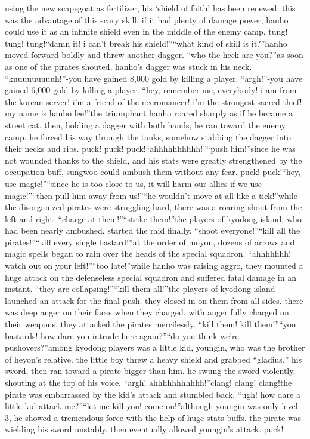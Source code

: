 using the new scapegoat as fertilizer, his ‘shield of faith’ has been renewed.
 this was the advantage of this scary skill.
 if it had plenty of damage power, hanho could use it as an infinite shield even in the middle of the enemy camp.
tung! tung! tung!“damn it! i can’t break his shield!”“what kind of skill is it?”hanho moved forward boldly and threw another dagger.
“who the heck are you?”as soon as one of the pirates shouted, hanho’s dagger was stuck in his neck.
“kuuuuuuuuuh!”-you have gained 8,000 gold by killing a player.
“argh!”-you have gained 6,000 gold by killing a player.
“hey, remember me, everybody! i am from the korean server! i’m a friend of the necromancer! i’m the strongest sacred thief! my name is hanho lee!”the triumphant hanho roared sharply as if he became a street cat.
then, holding a dagger with both hands, he ran toward the enemy camp.
 he forced his way through the tanks, somehow stabbing the dagger into their necks and ribs.
puck! puck! puck!“ahhhhhhhhhh!”“push him!”since he was not wounded thanks to the shield, and his stats were greatly strengthened by the occupation buff, sungwoo could ambush them without any fear.
puck! puck!“hey, use magic!”“since he is too close to us, it will harm our allies if we use magic!”“then pull him away from us!”“he wouldn’t move at all like a tick!”while the disorganized pirates were struggling hard, there was a roaring shout from the left and right.
“charge at them!”“strike them!”the players of kyodong island, who had been nearly ambushed, started the raid finally.
“shoot everyone!”“kill all the pirates!”“kill every single bastard!”at the order of muyon, dozens of arrows and magic spells began to rain over the heads of the special squadron.
“ahhhhhhh! watch out on your left!”“too late!”while hanho was raising aggro, they mounted a huge attack on the defenseless special squadron and suffered fatal damage in an instant.
“they are collapsing!”“kill them all!”the players of kyodong island launched an attack for the final push.
 they closed in on them from all sides.
 there was deep anger on their faces when they charged.
 with anger fully charged on their weapons, they attacked the pirates mercilessly.
“kill them! kill them!”“you bastards! how dare you intrude here again?”“do you think we’re pushovers?”among kyodong players was a little kid, youngin, who was the brother of heyon’s relative.
the little boy threw a heavy shield and grabbed “gladius,” his sword, then ran toward a pirate bigger than him.
 he swung the sword violently, shouting at the top of his voice.
“argh! ahhhhhhhhhhh!”clang! clang! clang!the pirate was embarrassed by the kid’s attack and stumbled back.
“ugh! how dare a little kid attack me?”“let me kill you! come on!”although youngin was only level 3, he showed a tremendous force with the help of huge stats buffs.
 the pirate was wielding his sword unstably, then eventually allowed youngin’s attack.
puck!

